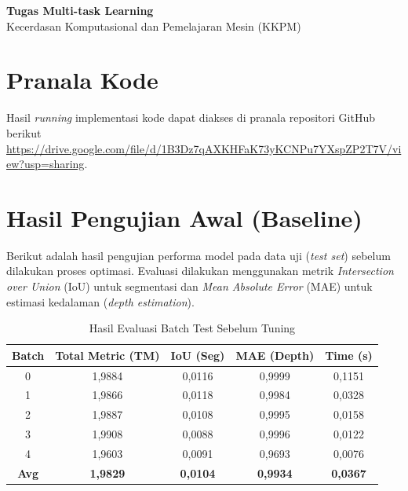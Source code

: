 \documentclass[12pt, a4paper]{article}
\begin{document}
\begin{center}
    \large \textbf{Tugas Multi-task Learning} \\[0.2cm]
    \large Kecerdasan Komputasional dan Pemelajaran Mesin (KKPM)  \\[0.5cm]
\end{center}


\section{Pranala Kode}
Hasil \textit{running} implementasi kode dapat diakses di pranala repositori GitHub berikut \url{https://drive.google.com/file/d/1B3Dz7qAXKHFaK73yKCNPu7YXspZP2T7V/view?usp=sharing}.

\section{Hasil Pengujian Awal (Baseline)}

Berikut adalah hasil pengujian performa model pada data uji (\textit{test set}) sebelum dilakukan proses optimasi. Evaluasi dilakukan menggunakan metrik \textit{Intersection over Union} (IoU) untuk segmentasi dan \textit{Mean Absolute Error} (MAE) untuk estimasi kedalaman (\textit{depth estimation}).

\begin{table}[h]
    \centering
    \caption{Hasil Evaluasi Batch Test Sebelum Tuning}
    \label{tab:test_results_baseline}
    \begin{tabular}{|c|c|c|c|c|}
        \hline
        \textbf{Batch} & \textbf{Total Metric (TM)} & \textbf{IoU (Seg)} & \textbf{MAE (Depth)} & \textbf{Time (s)} \\ \hline
        0              & 1,9884                     & 0,0116             & 0,9999               & 0,1151            \\ \hline
        1              & 1,9866                     & 0,0118             & 0,9984               & 0,0328            \\ \hline
        2              & 1,9887                     & 0,0108             & 0,9995               & 0,0158            \\ \hline
        3              & 1,9908                     & 0,0088             & 0,9996               & 0,0122            \\ \hline
        4              & 1,9603                     & 0,0091             & 0,9693               & 0,0076            \\ \hline
        \textbf{Avg}   & \textbf{1,9829}            & \textbf{0,0104}    & \textbf{0,9934}      & \textbf{0,0367}   \\ \hline
    \end{tabular}
\end{table}
\end{document}
